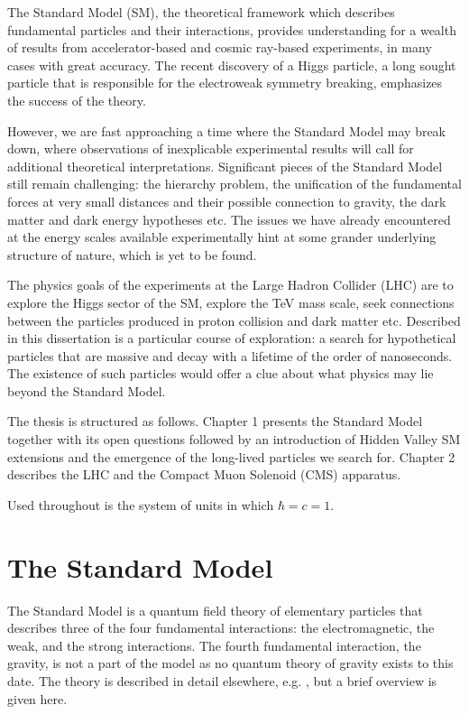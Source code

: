 The Standard Model (SM), the theoretical framework which describes fundamental particles
and their interactions, provides understanding for a wealth of results from accelerator-based
and cosmic ray-based experiments, in many cases with great accuracy.
The recent discovery of a Higgs particle, a long sought particle that is responsible for
the electroweak symmetry 
breaking, emphasizes the success of the theory.

However, we are fast approaching a time where the Standard Model may break down,
where observations of inexplicable experimental results will call for additional theoretical 
interpretations. Significant pieces of the Standard Model still remain challenging: the hierarchy
problem, the unification of the fundamental forces at very small distances and their possible
connection to gravity, the dark matter and dark energy hypotheses etc.
The issues we have already encountered at the energy scales available experimentally 
hint at some grander underlying structure of nature, which is yet to be found.

The physics goals of the experiments at the Large Hadron Collider (LHC) are to
explore the Higgs sector of the SM, explore the TeV mass
scale, seek connections between the particles produced in proton collision and dark matter etc.
Described in this dissertation is a particular course of exploration: a search for hypothetical
particles that are massive and decay with a lifetime of the order of nanoseconds. The existence
of such particles would offer a clue about what physics may lie beyond the Standard Model.

The thesis is structured as follows. Chapter 1 presents the Standard Model together with its
open questions followed by an introduction of Hidden Valley SM extensions and 
the emergence of the long-lived particles we search for.
Chapter 2 describes the LHC and the Compact Muon Solenoid (CMS) apparatus.

Used throughout is the system of units in which $\hbar=c=1$.


\section{The Standard Model}

The Standard Model is a quantum field theory of elementary particles that describes 
three of the four fundamental interactions: 
the electromagnetic, the weak, and the strong interactions. The fourth fundamental
interaction, the gravity, 
is not a part of the model as no quantum theory of gravity exists to this date. 
The theory is described in detail elsewhere, e.g. \cite{Tully:1417476}, 
but a brief overview is given here.

